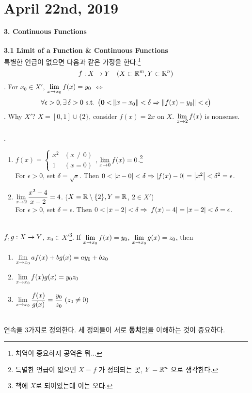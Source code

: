 \section*{April 22nd, 2019}
\textbf{\large 3. Continuous Functions}\\
\\
\textbf{3.1 Limit of a Function \& Continuous Functions}\\
특별한 언급이 없으면 다음과 같은 가정을 한다.\footnote{치역이 중요하지 공역은 뭐...} $$f:X\rightarrow Y \quad ( X\subset \mathbb{R}^m, Y\subset \mathbb{R}^n )$$
. For $x_0\in X'$, $\displaystyle \lim_{x\rightarrow x_0} f(x) = y_0$ $\iff$ $$\forall \epsilon >0, \exists\, \delta > 0 \text{ s.t. } \big(\mathbf{0 <} \left\lVert x-x_0\right\rVert < \delta \Rightarrow \left\lVert f(x) - y_0\right\rVert < \epsilon\big)$$
\rmk. Why $X'$? $X = [0, 1]\cup \{2\}$, consider $f(x) = 2x$ on $X$. $\displaystyle \lim_{x\rightarrow 2} f(x)$ is nonsense.\\
\\
\ex.
\begin{enumerate}
	\item $f(x)=\begin{cases}
		x^2 & (x\neq 0)\\ 1 & (x = 0)
	\end{cases}$, $\displaystyle \lim_{x\rightarrow 0} f(x) = 0$.\footnote{특별한 언급이 없으면 $X = f$ 가 정의되는 곳, $Y = \mathbb{R}^n$ 으로 생각한다.}\\
	For $\epsilon >0$, set $\delta = \sqrt{\epsilon}$. Then $0 < \left|x - 0\right| < \delta \Rightarrow \left|f(x) - 0\right| = \left|x^2\right| < \delta^2 = \epsilon$.
	\item $\displaystyle \lim_{x\rightarrow 2} \frac{x^2-4}{x-2} =4$. ($X = \mathbb{R}\setminus \{2\}, Y = \mathbb{R}$, $2 \in X'$)\\
	For $\epsilon > 0$, set $\delta = \epsilon$. Then $0<\left|x - 2\right| < \delta \Rightarrow \left|f(x) - 4\right| = \left|x -2\right| < \delta = \epsilon$.
\end{enumerate}~\\
 $f, g: X\rightarrow Y$, $x_0\in X'$\footnote{책에 $X$로 되어있는데 이는 오타.}. If $\displaystyle \lim_{x\rightarrow x_0} f(x) = y_0$, $\displaystyle \lim_{x\rightarrow x_0} g(x) = z_0$, then
\begin{enumerate}
	\item $\displaystyle \lim_{x\rightarrow x_0} af(x) + bg(x) = ay_0+bz_0$
	\item $\displaystyle \lim_{x\rightarrow x_0} f(x)g(x) = y_0z_0$
	\item $\displaystyle \lim_{x\rightarrow x_0} \frac{f(x)}{g(x)} = \frac{y_0}{z_0} \;(z_0\neq 0)$
\end{enumerate}~\\
연속을 3가지로 정의한다. 세 정의들이 서로 \textbf{동치}임을 이해하는 것이 중요하다.\\
